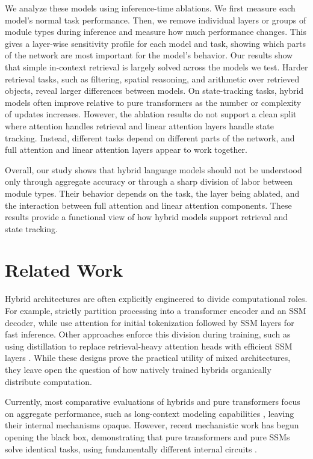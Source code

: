 \documentclass{article}
\begin{document}
We analyze these models using inference-time ablations. We first measure each model's normal task performance. Then, we remove individual layers or groups of module types during inference and measure how much performance changes. This gives a layer-wise sensitivity profile for each model and task, showing which parts of the network are most important for the model's behavior.
Our results show that simple in-context retrieval is largely solved across the models we test. Harder retrieval tasks, such as filtering, spatial reasoning, and arithmetic over retrieved objects, reveal larger differences between models. On state-tracking tasks, hybrid models often improve relative to pure transformers as the number or complexity of updates increases. However, the ablation results do not support a clean split where attention handles retrieval and linear attention layers handle state tracking. Instead, different tasks depend on different parts of the network, and full attention and linear attention layers appear to work together.

Overall, our study shows that hybrid language models should not be understood only through aggregate accuracy or through a sharp division of labor between module types. Their behavior depends on the task, the layer being ablated, and the interaction between full attention and linear attention components. These results provide a functional view of how hybrid models support retrieval and state tracking.

\section{Related Work}
\label{sec:rw}
Hybrid architectures are often explicitly engineered to divide computational roles. For example, \cite{Zhu2025} strictly partition processing into a transformer encoder and an SSM decoder, while \cite{ryoo2025generalizablerealtimeneuraldecoding} use attention for initial tokenization followed by SSM layers for fast inference. Other approaches enforce this division during training, such as using distillation to replace retrieval-heavy attention heads with efficient SSM layers \cite{bick2026retrievalawaredistillationtransformerssmhybrids}. While these designs prove the practical utility of mixed architectures, they leave open the question of how natively trained hybrids organically distribute computation.

Currently, most comparative evaluations of hybrids and pure transformers focus on aggregate performance, such as long-context modeling capabilities \cite{wornow2025contextcluesevaluatinglong}, leaving their internal mechanisms opaque. However, recent mechanistic work has begun opening the black box, demonstrating that pure transformers and pure SSMs solve identical tasks, using fundamentally different internal circuits \cite{arora2026mechanisticevaluationtransformersstate}.
\end{document}
